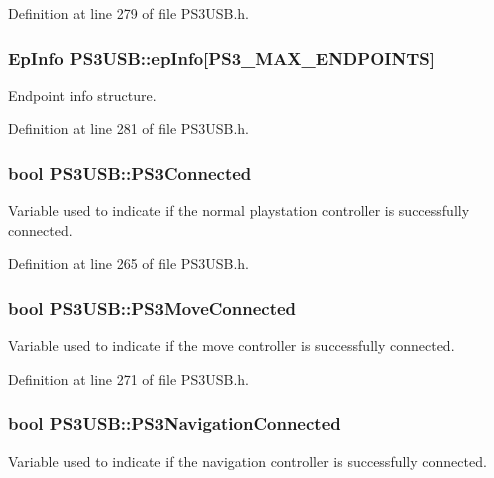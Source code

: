 \-Definition at line 279 of file \-P\-S3\-U\-S\-B.\-h.

\hypertarget{class_p_s3_u_s_b_a394dbb0a59b587210e5958f08dac48f1}{
\subsubsection[{ep\-Info}]{\setlength{\rightskip}{0pt plus 5cm}\-Ep\-Info {\bf \-P\-S3\-U\-S\-B\-::ep\-Info}\mbox{[}{\bf \-P\-S3\-\_\-\-M\-A\-X\-\_\-\-E\-N\-D\-P\-O\-I\-N\-T\-S}\mbox{]}}}\label{class_p_s3_u_s_b_a394dbb0a59b587210e5958f08dac48f1}
\-Endpoint info structure. 

\-Definition at line 281 of file \-P\-S3\-U\-S\-B.\-h.

\hypertarget{class_p_s3_u_s_b_a0dad8754ff18d0c375c2569791d50876}{
\subsubsection[{\-P\-S3\-Connected}]{\setlength{\rightskip}{0pt plus 5cm}bool {\bf \-P\-S3\-U\-S\-B\-::\-P\-S3\-Connected}}}\label{class_p_s3_u_s_b_a0dad8754ff18d0c375c2569791d50876}
\-Variable used to indicate if the normal playstation controller is successfully connected. 

\-Definition at line 265 of file \-P\-S3\-U\-S\-B.\-h.

\hypertarget{class_p_s3_u_s_b_a89aa4233f3eeeb99693a099da527ec28}{
\subsubsection[{\-P\-S3\-Move\-Connected}]{\setlength{\rightskip}{0pt plus 5cm}bool {\bf \-P\-S3\-U\-S\-B\-::\-P\-S3\-Move\-Connected}}}\label{class_p_s3_u_s_b_a89aa4233f3eeeb99693a099da527ec28}
\-Variable used to indicate if the move controller is successfully connected. 

\-Definition at line 271 of file \-P\-S3\-U\-S\-B.\-h.

\hypertarget{class_p_s3_u_s_b_a54b2dcaa1e9acef83de2376b50c7ff09}{
\subsubsection[{\-P\-S3\-Navigation\-Connected}]{\setlength{\rightskip}{0pt plus 5cm}bool {\bf \-P\-S3\-U\-S\-B\-::\-P\-S3\-Navigation\-Connected}}}\label{class_p_s3_u_s_b_a54b2dcaa1e9acef83de2376b50c7ff09}
\-Variable used to indicate if the navigation controller is successfully connected. 

